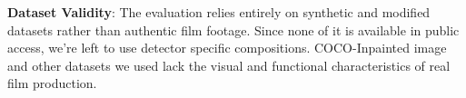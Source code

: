 \textbf{Dataset Validity}: The evaluation relies entirely on synthetic and modified datasets rather than authentic film footage. Since none of it is available in public access, we're left to use detector specific compositions. COCO-Inpainted image and other datasets we used lack the visual and functional characteristics of real film production.